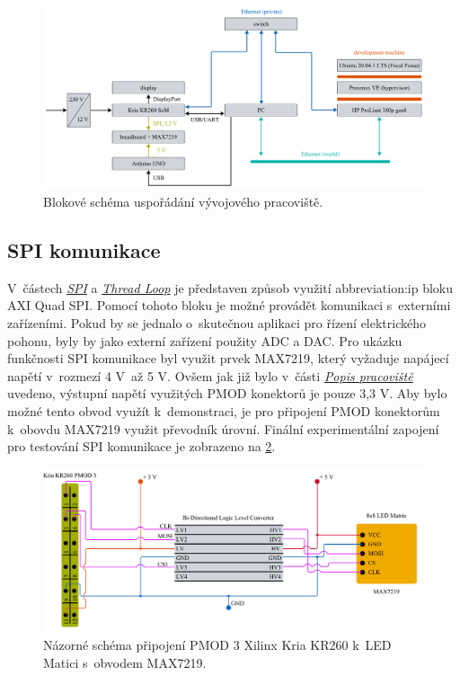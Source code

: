 \documentclass[a4paper, twoside, 11pt]{article}
\begin{document}
\begin{figure}[htbp!]
	\centering
	\includegraphics[width=1\textwidth]{src/pdf/workspace-scheme.pdf}
	\caption{Blokové schéma uspořádání vývojového pracoviště.}
	\label{fig:workspace-scheme}
\end{figure}

	\subsection{SPI komunikace}\label{subsec:spi-komunikace}
	V~částech \hyperref[subsec:spi]{\textit{SPI}} a \hyperref[subsubsec:thread-loop]{\textit{Thread Loop}} je představen způsob využití \gls{abbreviation:ip} bloku AXI Quad SPI. Pomocí tohoto bloku je možné provádět komunikaci s~externími zařízeními. Pokud by se jednalo o~skutečnou aplikaci pro řízení elektrického pohonu, byly by jako externí zařízení použity ADC a DAC. Pro ukázku funkčnosti SPI komunikace byl využit prvek MAX7219, který vyžaduje napájecí napětí v~rozmezí 4 V~až 5 V. Ovšem jak již bylo v~části \hyperref[sec:popis-pracoviste]{\textit{Popis pracoviště}} uvedeno, výstupní napětí využitých PMOD konektorů je pouze 3,3 V. Aby bylo možné tento obvod využít k~demonstraci, je pro připojení PMOD konektorům k~obovdu MAX7219 využit převodník úrovní. Finální experimentální zapojení pro testování SPI komunikace je zobrazeno na \ref{fig:spi-test-connection}.



	\begin{figure}[htbp!]
		\centering
		\includegraphics[width=1\textwidth]{src/pdf/spi-test-connection.pdf}
		\caption{Názorné schéma připojení PMOD 3 Xilinx Kria KR260 k~LED Matici s~obvodem MAX7219.}
		\label{fig:spi-test-connection}
	\end{figure}
\end{document}
